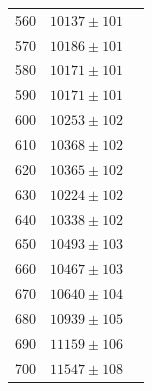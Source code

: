 \documentclass[titlepage = firstcover]{scrartcl}
\begin{document}
\begin{table}[h]
\begin{tabular}{c c c }
                    560 &	$10137  \pm 101$ \\
                    570 &	$10186  \pm 101$ \\
                    580 &	$10171  \pm 101$ \\
                    590 &	$10171  \pm 101$ \\
                    600 &	$10253  \pm 102$ \\
                    610 &	$10368  \pm 102$ \\
                    620 &	$10365  \pm 102$ \\
                    630 &	$10224  \pm 102$ \\
                    640 &	$10338  \pm 102$ \\
                    650 &	$10493  \pm 103$ \\
                    660 &	$10467  \pm 103$ \\
                    670 &	$10640  \pm 104$ \\
                    680 &	$10939  \pm 105$ \\
                    690 &	$11159  \pm 106$ \\
                    700 &	$11547  \pm 108$ \\
                    \bottomrule
                \end{tabular}
            \end{table}
        \noindent
            
        
\end{document}
